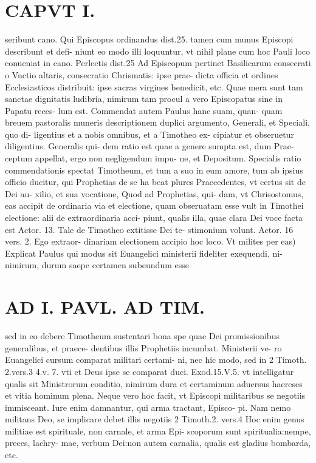 \documentclass{article}
\begin{document}
\begin{pages}
\section*{CAPVT  I. }
\marginpar{[ p.35 ]}\pstart seribunt cano. Qui Episcopus ordinandus dist.25. tamen cum munus Episcopi describunt et defi- niunt eo modo illi loquuntur, vt nihil plane cum hoc Pauli loco conueniat in cano. Perlectis dist.25 Ad Episcopum pertinet Basilicarum consecrati o Vnctio altaris, consecratio Chrismatis: ipse prae- dicta officia et ordines Ecclesiasticos distribuit: ipse sacras virgines benedicit, etc. Quae mera sunt tam sanctae dignitatis ludibria, nimirum tam procul a vero Episcopatus sine in Papatu reces- lum est. Commendat autem Paulus hanc suam, quan- quam breuem pastoralis muneris descriptionem duplici argumento, Generali, et Speciali, quo di- ligentius et a nobis omnibus, et a Timotheo ex- cipiatur et obseruetur diligentius. Generalis qui- dem ratio est quae a genere sumpta est, dum Prae- ceptum appellat, ergo non negligendum impu- ne, et Depositum. Specialis ratio commendationis spectat Timotheum, et tum a suo in eum amore, tum ab ipsius officio ducitur, qui Prophetias de se ha beat plures Praecedentes, vt certus sit de Dei au- xilio, et sua vocatione, Quod ad Prophetias, qui- dam, vt Chrisostomus, eas accipit de ordinaria via et electione, quam obseruatam esse vult in Timothei electione: alii de extraordinaria acci- piunt, qualis illa, quae clara Dei voce facta est Actor. 13. Tale de Timotheo extitisse Dei te- stimonium volunt. Actor. 16 vers. 2. Ego extraor- dinariam electionem accipio hoc loco. Vt milites per eas) Explicat Paulus qui modus sit Euangelici ministerii fideliter exequendi, ni- nimirum, durum saepe certamen subeundum esse  \pend
\section*{AD I. PAVL. AD TIM. }
\marginpar{[ p.36 ]}\pstart sed in eo debere Timotheum sustentari bona spe quae Dei promissionibus generalibus, et praece- dentibus illis Prophetiis incumbat. Ministerii ve- ro Euangelici cursum comparat militari certami- ni, nec hic modo, sed in 2 Timoth. 2.vers.3 4.v. 7. vti et Deus ipse se comparat duci. Exod.15.V.5. vt intelligatur qualis sit Ministrorum conditio, nimirum dura et certaminum aduersus haereses et vitia hominum plena. Neque vero hoc facit, vt Episcopi militaribus se negotiis immisceant. Iure enim damnantur, qui arma tractant, Episco- pi. Nam nemo militans Deo, se implicare debet illis negotiis 2 Timoth.2. vers.4 Hoc enim genus militiae est spirituale, non carnale, et arma Epi- scoporum sunt spiritualia:nempe, preces, lachry- mae, verbum Dei:non autem carnalia, qualis est gladius bombarda, etc.  \pend\pstart {}
{}

\end{pages}
\end{document}
